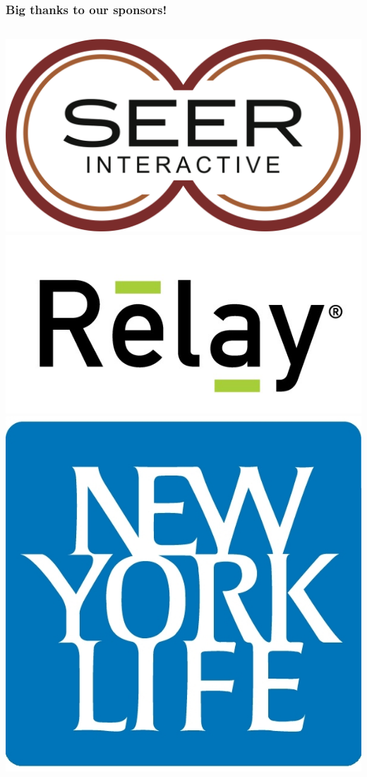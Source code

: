 \documentclass[xcolor=dvipsnames,red]{beamer}
\begin{document}
\begin{frame}
\frametitle{Big thanks to our sponsors!}

\begin{columns}
\begin{column}{.33\textwidth}
\includegraphics[width=1\textwidth]{imgs/seer.png}\\
\vspace{.5 cm}
\includegraphics[width=1\textwidth]{imgs/relay.jpg}\\
\vspace{.5 cm}
\includegraphics[width=.75\textwidth]{imgs/new_york_life.jpg}
\end{column}


\end{columns}
\end{frame}
\end{document}
